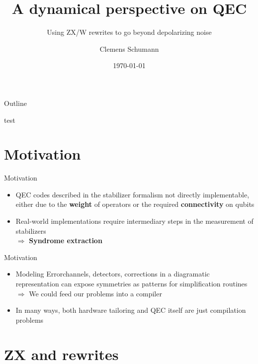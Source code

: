 \documentclass[notes]{beamer}
\title{A dynamical perspective on QEC}
\subtitle{Using ZX/W rewrites to go beyond depolarizing noise}
\author{Clemens Schumann}
\date{\today}
\begin{document}
\begin{frame}
  \titlepage
\end{frame}

\begin{frame}{Outline}
  \tableofcontents
\end{frame}
\begin{frame}
    test
\end{frame}
\section{Motivation}
\begin{frame}
  \centering
  \Huge \insertsection
\end{frame}
\begin{frame}{Motivation}
    \begin{itemize}
        \item QEC codes described in the stabilizer formalism not directly implementable, either due to the \textbf{weight} of operators or 
        the required \textbf{connectivity} on qubits
        \item Real-world implementations require intermediary steps in the measurement of stabilizers\\\hspace{0.5cm} $\Rightarrow$ \textbf{Syndrome extraction}
        
    \end{itemize}
\end{frame}
\begin{frame}{Motivation}
    \begin{itemize}
        \item Modeling Errorchannels, detectors, corrections in a diagramatic representation can expose symmetries as patterns
        for simplification routines\\
        \hspace{1em} $\Rightarrow$ We could feed our problems into a compiler
        \item In many ways, both hardware tailoring and QEC itself are just compilation problems
        
    \end{itemize}
\end{frame}

\section{ZX and rewrites}
\begin{frame}
  \centering
  \Huge \insertsection
\end{frame}
\end{document}
